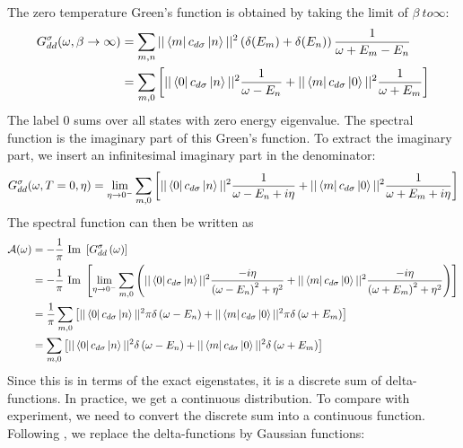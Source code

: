 \documentclass[twoside]{report}
\numberwithin{equation}{section}
\begin{document}
The zero temperature Green's function is obtained by taking the limit of \(\beta\ to \infty\):
\begin{equation}\begin{aligned}
	G_{d d}^\sigma(\omega, \beta \to \infty) &= \sum_{m,n}||\bra{m}c_{d\sigma}\ket{n}||^2\left(\delta(E_m) + \delta(E_n)\right)\frac{1}{\omega + E_m - E_n}\\
						 &=\sum_{m,0}\left[||\bra{0}c_{d\sigma}\ket{n}||^2\frac{1}{\omega - E_n} + ||\bra{m}c_{d\sigma}\ket{0}||^2\frac{1}{\omega + E_m}\right]\\
\end{aligned}\end{equation}
The label 0 sums over all states with zero energy eigenvalue. The spectral function is the imaginary part of this Green's function. To extract the imaginary part, we insert an infinitesimal imaginary part in the denominator:
\begin{equation}\begin{aligned}
	G_{d d}^\sigma(\omega, T = 0, \eta) = \lim_{\eta \to 0^-}\sum_{m,0}\left[||\bra{0}c_{d\sigma}\ket{n}||^2\frac{1}{\omega - E_n + i\eta} + ||\bra{m}c_{d\sigma}\ket{0}||^2\frac{1}{\omega + E_m + i\eta}\right]\\
\end{aligned}\end{equation}
The spectral function can then be written as
\begin{equation}\begin{aligned}
	\mathcal{A(\omega)} &= -\frac{1}{\pi}\text{ Im }\left[G_{dd}^\sigma\left( \omega \right) \right] \\
			    &= -\frac{1}{\pi}\text{ Im }\left[\lim_{\eta \to 0^-}\sum_{m,0}\left(||\bra{0}c_{d\sigma}\ket{n}||^2\frac{-i\eta}{\left(\omega - E_n\right)^2 + \eta^2} + ||\bra{m}c_{d\sigma}\ket{0}||^2\frac{-i\eta}{\left(\omega + E_m\right)^2 + \eta^2}\right)\right]\\
			    &= \frac{1}{\pi}\sum_{m,0}\left[||\bra{0}c_{d\sigma}\ket{n}||^2\pi\delta\left(\omega - E_n\right) + ||\bra{m}c_{d\sigma}\ket{0}||^2\pi\delta\left(\omega + E_m\right)\right]\\
			    &= \sum_{m,0}\left[||\bra{0}c_{d\sigma}\ket{n}||^2\delta\left(\omega - E_n\right) + ||\bra{m}c_{d\sigma}\ket{0}||^2\delta\left(\omega + E_m\right)\right]\\
\end{aligned}\end{equation}
Since this is in terms of the exact eigenstates, it is a discrete sum of delta-functions. In practice, we get a continuous distribution. To compare with experiment, we need to convert the discrete sum into a continuous function. Following \cite{bulla_costi_nrg}, we replace the delta-functions by Gaussian functions:
\end{document}
